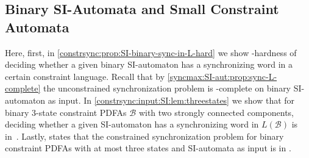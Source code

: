 \subsection{Binary SI-Automata and Small Constraint Automata}
\label{constrsync:input:SI:sec:constraintaut}

Here, first, in \cref{constrsync:prop:SI-binary-sync-in-L-hard} 
we show \LOGSPACE-hardness of deciding whether
a given binary SI-automaton has a synchronizing word in 
a certain constraint language. Recall
that by \cref{syncmax:SI-aut:prop:sync-L-complete}
the unconstrained synchronization problem is \LOGSPACE-complete
on binary SI-automaton as input.
In \cref{constrsync:input:SI:lem:threestates} 
we show that for binary $3$-state constraint PDFAs $\mathcal B$
with two strongly connected components,
deciding
whether a given SI-automaton has a synchronizing
word in $L(\mathcal B)$ is in~\LOGSPACE.
Lastly,  
states that the constrained synchronization problem
for binary constraint PDFAs with at most three states and SI-automata
as input is in \NL. 


